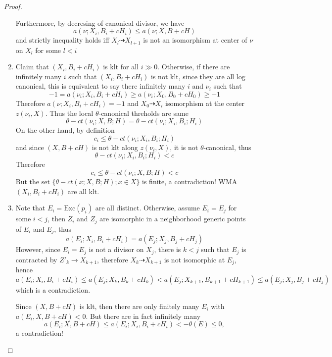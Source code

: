 \documentclass{article}
\begin{document}
\begin{proof}
\begin{enumerate}[Step 1]
		Furthermore, by decresing of canonical divisor, we have
		$$ a(\nu;X_i,B_i+cH_i)\leqslant a(\nu;X,B+cH) $$
		and strictly inequality holds iff $ X_l\dashrightarrow X_{l+1} $ is not an isomorphism at center of $ \nu $ on $ X_l $ for some $ l<i $
		\item Claim that $ (X_i,B_i+cH_i) $ is klt for all $ i\gg 0 $. Otherwise, if there are infinitely many $ i $ such that $ (X_i,B_i+cH_i) $ is not klt, since they are all log canonical, this is equivalent to say there infinitely many $ i $ and $ \nu_i $ such that
		$$ -1=a(\nu_i;X_i,B_i+cH_i)\geqslant a(\nu_i;X_0,B_0+cH_0)\geqslant -1  $$
		Therefore $ a(\nu;X_i,B_i+cH_i)=-1 $ and $ X_0\dashrightarrow X_i $ isomorphism at the center $ z(\nu_i,X) $. Thus the local $ \theta $-canonical threholds are same
		$$ \theta-ct(\nu_i;X,B;H)=\theta-ct(\nu_i;X_i,B_i;H_i) $$
		On the other hand, by definition
		$$ c_i \leqslant \theta-ct(\nu_i;X_i,B_i;H_i) $$
		and since $ (X,B+cH) $ is not klt along $ z(\nu_i,X) $, it is not $ \theta $-canonical, thus
		$$ \theta-ct(\nu_i;X_i,B_i;H_i)<c $$
		Therefore
		$$ c_i\leqslant \theta-ct(\nu_i;X,B;H)<c $$
		But the set $\{ \theta-ct(x;X,B;H);x\in X\} $ is finite, a contradiction! WMA $ (X_i,B_i+cH_i) $ are all klt.
		\item Note that $ E_i=\mathrm{Exc}(p_i) $ are all distinct. Otherwise, assume $ E_i=E_j $ for some $ i<j $, then $ Z_i $ and $ Z_j $ are isomorphic in a neighborhood generic points of $ E_i $ and $ E_j $, thus 
		$$ a(E_i;X_i,B_i+cH_i)=a(E_j;X_j,B_j+cH_j) $$
		However, since $ E_i=E_j $ is not a divisor on $ X_j $, there is $ k<j $ such that $ E_j $ is contracted by $ Z'_k\to X_{k+1} $, therefore $ X_k\dashrightarrow X_{k+1} $ is not isomorphic at $ E_j $, hence 
		$$ a(E_i;X_i,B_i+cH_i)\leqslant a(E_j;X_k,B_k+cH_k)<a(E_j;X_{k+1},B_{k+1}+cH_{k+1})\leqslant a(E_j;X_j,B_j+cH_j) $$  
		which is a contradiction.
		
		Since $ (X,B+cH) $ is klt, then there are only finitely many $ E_i $ with $ a(E_i,X,B+cH)<0 $. But there are in fact infinitely many
		$$ a(E_i;X,B+cH)\leqslant  a(E_i;X_i,B_i+cH_i)<-\theta (E)\leqslant 0 ,$$ 
		a contradiction! 
	\end{enumerate}
\end{proof}
\end{document}
